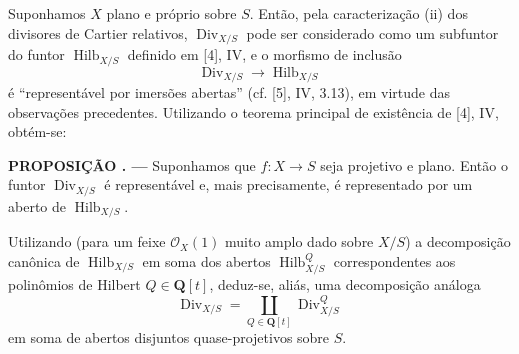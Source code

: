 \documentclass[11pt,twoside,openany]{book}
\numberwithin{equation}{section}
\newcommand{\src}[1]{%
  \phantomsection\hypertarget{src:#1}{}%
  \marginpar{\raggedleft\footnotesize\sffamily #1}%
}
\theoremstyle{plain}
\theoremstyle{definition}
\theoremstyle{remark}
\newcommand{\result}[2]{%
  \par\medskip\noindent\textbf{#1%
  \if\relax\detokenize{#2}\relax\else\space#2\fi. ---}\enspace
}
\newcommand{\FgaUnitKey}{frontmatter}
\renewcommand{\src}[1]{%
  \phantomsection\hypertarget{src:\FgaUnitKey:#1}{}%
  \marginpar{\raggedleft\footnotesize\sffamily #1}%
}
\begin{document}
Suponhamos $X$ plano e próprio sobre $S$. Então, pela caracterização (ii) dos
divisores de Cartier relativos, $\operatorname{Div}_{X/S}$ pode ser considerado
como um subfuntor do funtor $\operatorname{Hilb}_{X/S}$ definido em [4], IV, e o
morfismo de inclusão
\[
\operatorname{Div}_{X/S}\longrightarrow\operatorname{Hilb}_{X/S}
\]
é ``representável por imersões abertas'' (cf. [5], IV, 3.13), em virtude das
observações precedentes. Utilizando o teorema principal de existência de [4],
IV, obtém-se:
\src{152}
\result{PROPOSIÇÃO}{4.1} Suponhamos que $f:X\longrightarrow S$ seja projetivo
e plano. Então o funtor $\operatorname{Div}_{X/S}$ é representável e, mais
precisamente, é representado por um aberto de $\operatorname{Hilb}_{X/S}$.

Utilizando (para um feixe $\mathcal O_X(1)$ muito amplo dado sobre $X/S$) a
decomposição canônica de $\operatorname{Hilb}_{X/S}$ em soma dos abertos
$\operatorname{Hilb}^{Q}_{X/S}$ correspondentes aos polinômios de Hilbert
$Q\in\mathbf Q[t]$, deduz-se, aliás, uma decomposição análoga
\[
\operatorname{Div}_{X/S}=
\coprod_{Q\in\mathbf Q[t]}\operatorname{Div}^{Q}_{X/S}
\]
em soma de abertos disjuntos quase-projetivos sobre $S$.
\end{document}
